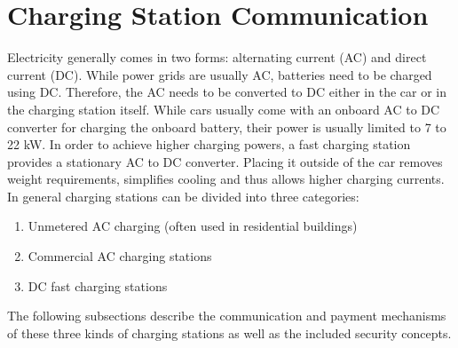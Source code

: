 \documentclass[conference,flushend]{iaria} %
\begin{document}
\section{Charging Station Communication}
Electricity generally comes in two forms: alternating current (AC) and direct current (DC).
While power grids are usually AC, batteries need to be charged using DC.
Therefore, the AC needs to be converted to DC either in the car or in the charging station itself.
While cars usually come with an onboard AC to DC converter for charging the onboard battery, their power is usually limited to 7 to 22 kW.
In order to achieve higher charging powers, a fast charging station provides a stationary AC to DC converter. Placing it outside of the car removes weight requirements, simplifies cooling and thus allows higher charging currents. \\
In general charging stations can be divided into three categories:
\begin{enumerate}
\item Unmetered AC charging (often used in residential buildings)
\item Commercial AC charging stations
\item DC fast charging stations
\end{enumerate}%
%
The following subsections describe the communication and payment mechanisms of these three kinds of charging stations as well as the included security concepts.
\end{document}
